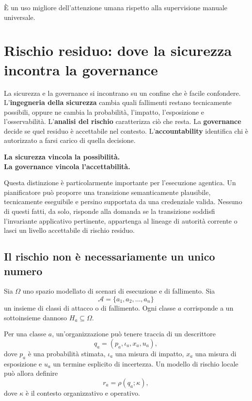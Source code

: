 \documentclass[10pt,oneside,openany]{book}
\newcommand{\term}[1]{\textbf{#1}}
\begin{document}
È un uso migliore dell'attenzione umana rispetto alla supervisione manuale universale.

\chapter{Rischio residuo: dove la sicurezza incontra la governance}\label{ch:residualrisk}

La sicurezza e la governance si incontrano su un confine che è facile confondere. L'\term{ingegneria della sicurezza} cambia quali fallimenti restano tecnicamente possibili, oppure ne cambia la probabilità, l'impatto, l'esposizione e l'osservabilità. L'\term{analisi del rischio} caratterizza ciò che resta. La \term{governance} decide se quel residuo è accettabile nel contesto. L'\term{accountability} identifica chi è autorizzato a farsi carico di quella decisione.

\begin{center}
\sffamily\bfseries
La sicurezza vincola la possibilità.\\
La governance vincola l'accettabilità.
\end{center}

Questa distinzione è particolarmente importante per l'esecuzione agentica. Un pianificatore può proporre una transizione semanticamente plausibile, tecnicamente eseguibile e persino supportata da una credenziale valida. Nessuno di questi fatti, da solo, risponde alla domanda se la transizione soddisfi l'invariante applicativo pertinente, appartenga al lineage di autorità corrente o lasci un livello accettabile di rischio residuo.

\section{Il rischio non è necessariamente un unico numero}

Sia $\Omega$ uno spazio modellato di scenari di esecuzione e di fallimento. Sia
\[
\mathcal{A}=\{a_1,a_2,\ldots,a_n\}
\]
un insieme di classi di attacco o di fallimento. Ogni classe $a$ corrisponde a un sottoinsieme dannoso $H_a\subseteq\Omega$.

Per una classe $a$, un'organizzazione può tenere traccia di un descrittore
\[
q_a=(p_a,\iota_a,x_a,u_a),
\]
dove $p_a$ è una probabilità stimata, $\iota_a$ una misura di impatto, $x_a$ una misura di esposizione e $u_a$ un termine esplicito di incertezza. Un modello di rischio locale può allora definire
\[
r_a=\rho(q_a;\kappa),
\]
dove $\kappa$ è il contesto organizzativo e operativo.
\end{document}
